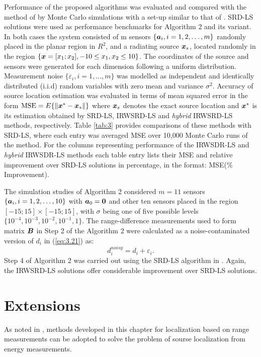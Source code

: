 Performance of the proposed algorithms was evaluated and compared with the method of  \cite{BeckStLi} by Monte Carlo simulations with a set-up similar to that of \cite{BeckStLi}. SRD-LS solutions were used as performance benchmarks for Algorithm 2 and its variant. In both cases the system consisted of m sensors $\{\mbox{\boldmath$a$}_i, i=1, 2,\ldots,m\}$ randomly placed in the planar region in $R^2$, and a radiating source $\mbox{\boldmath$x$}_s$, located randomly in the region $\{\mbox{\boldmath$x$}=[x_1;x_2], -10\leq x_1,x_2\leq 10\}$. The coordinates of the source and sensors were generated for each dimension following a uniform distribution. Measurement noise $\{\varepsilon_i, i=1,\ldots,m\}$ was modelled as independent and identically distributed (i.i.d) random variables with zero mean and variance $\sigma^2$. Accuracy of source location estimation was evaluated in terms of mean squared error in the form $\mbox{MSE} = E\{\|\mbox{\boldmath$x$}^*-\mbox{\boldmath$x$}_s\|\}$ where $\mbox{\boldmath$x$}_s$ denotes the exact source location and $\mbox{\boldmath$x$}^*$ is its estimation obtained by SRD-LS, IRWSRD-LS and \textit{hybrid} IRWSRD-LS methods, respectively. Table \ref{tab:3} provides comparisons of these methods with SRD-LS, where each entry was averaged MSE over 10,000 Monte Carlo runs of the method. For the columns representing performance of the IRWSDR-LS and \textit{hybrid} IRWSDR-LS methods each table entry lists their MSE and relative improvement over SRD-LS solutions in percentage, in the format: MSE($\%$ Improvement).

The simulation studies of Algorithm 2 considered $m = 11$ sensors $\{\mbox{\boldmath$a$}_i, i=1, 2,\ldots,10\}$ with $\mbox{\boldmath$a$}_0=\mbox{\boldmath{$0$}}$ and other ten sensors placed in the region $[-15;15]\times[-15;15]$, with $\sigma$ being one of five possible levels $\{10^{-4}, 10^{-3}, 10^{-2}, 10^{-1}, 1\}$. The range-difference measurements used to form  matrix $\mbox{\boldmath$B$}$ in Step 2 of the Algorithm 2 were calculated as a noise-contaminated version of $d_i$ in (\ref{eq:3.21}) as:
\begin{equation}
\nonumber
d^{noisy}_i = d_i + \varepsilon_i.
\end{equation}
Step 4 of Algorithm 2 was carried out using the SRD-LS algorithm in \cite{BeckStLi}. Again, the IRWSRD-LS solutions offer considerable improvement over SRD-LS solutions.



\section{Extensions}


As noted in \cite{StLi}, methods developed in this chapter for localization based on range measurements can be adopted to solve the problem of sourse localization from energy measurements. 

